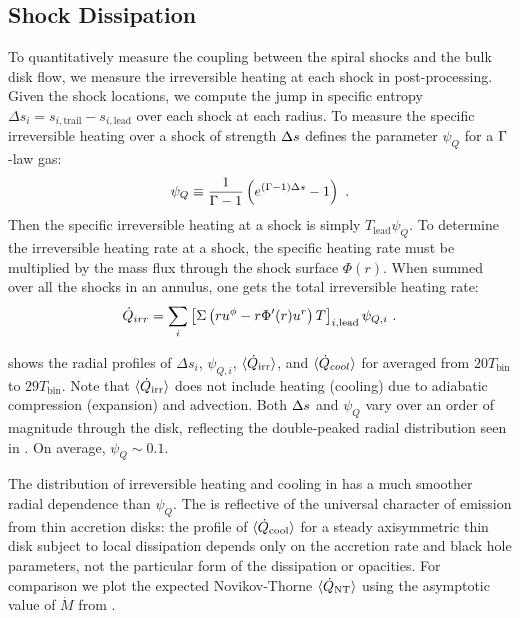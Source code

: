 \subsection{Shock Dissipation}

To quantitatively measure the coupling between the spiral shocks and the bulk disk flow, we measure the irreversible heating at each shock in post-processing.  Given the shock locations, we compute the jump in specific entropy $\Delta s_i = s_{i,\text{trail}} - s_{i,\text{lead}}$ over each shock at each radius.  To measure the specific irreversible heating over a shock of strength $\Delta s$ \cite{Rafikov16} defines the parameter $\psi_Q$ for a $\Gamma$-law gas:
\begin{equation}
	\psi_Q \equiv \frac{1}{\Gam - 1} \left( e^{(\Gam -1)\De s } - 1 \right) \ . \eqlabel{def-psi}
\end{equation}
Then the specific irreversible heating at a shock is simply $T_\text{lead} \psi_Q$.  To determine the irreversible heating rate at a shock, the specific heating rate must be multiplied by the mass flux through the shock surface $\Phi(r)$.  When summed over all the shocks in an annulus, one gets the total irreversible heating rate:
\begin{equation}
	\dot{Q}_{irr} = \sum_i \left[ \Sigma \left(r u^\phi - r \Phi'(r) u^r \right) T \right]_{i,\text{lead}} \psi_{Q,i} \ . \eqlabel{QirrRaf}
\end{equation}

 shows the radial profiles of $\Delta s_i$, $\psi_{Q,i}$, $\langle \dot{Q}_\text{irr} \rangle$, and $\langle \dot{Q}_{cool} \rangle$ for  averaged from $20 T_\text{bin}$ to $29 T_\text{bin}$.  Note that $\langle \dot{Q}_\text{irr} \rangle$ does not include heating (cooling) due to adiabatic compression (expansion) and advection.  Both $\Delta s$ and $\psi_Q$ vary over an order of magnitude through the disk, reflecting the double-peaked radial distribution seen in . On average, $\psi_Q \sim 0.1$.  

The distribution of irreversible heating and cooling in  has a much smoother radial dependence than $\psi_Q$. The is reflective of the universal character of emission from thin accretion disks: the profile of $\langle \dot{Q}_\text{cool} \rangle$ for a steady axisymmetric thin disk subject to local dissipation depends only on the accretion rate and black hole parameters, not the particular form of the dissipation or opacities.  For comparison we plot the expected Novikov-Thorne $\langle \dot{Q}_\text{NT} \rangle$ using the asymptotic value of $\dot{M}$ from . 

